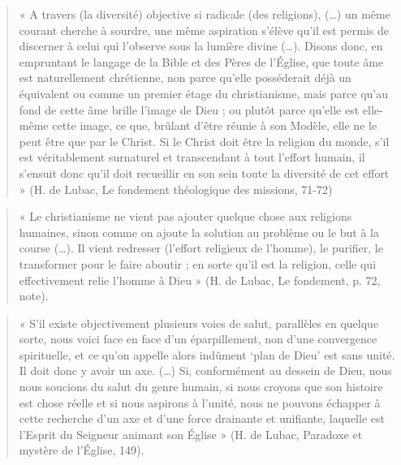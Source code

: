    \begin{quote}
        «  A  travers  (la  diversité)  objective  si  radicale  (des  religions),  (…)  un  même  courant  cherche  à  sourdre, une  même  aspiration  s’élève  qu’il  est  permis  de  discerner  à  celui  qui  l’observe  sous  la  lumière  divine (…).  Disons  donc,  en  empruntant  le  langage  de  la  Bible  et  des  Pères  de  l’Église,  que  toute  âme  est naturellement  chrétienne,  non  parce  qu’elle  posséderait  déjà  un  équivalent  ou  comme  un  premier  étage du  christianisme,  mais  parce  qu’au  fond  de  cette  âme  brille  l’image  de  Dieu  ;  ou  plutôt  parce  qu’elle est  elle-même  cette  image,  ce  que,  brûlant  d’être  réunie  à  son  Modèle,  elle  ne  le  peut  être  que  par  le Christ.  Si  le  Christ  doit  être  la  religion  du  monde,  s’il  est  véritablement  surnaturel  et  transcendant  à tout  l’effort  humain,  il  s’ensuit  donc  qu’il  doit  recueillir  en  son  sein  toute  la  diversité  de  cet  effort  » (H.  de  Lubac,  Le  fondement  théologique  des  missions, 71-72)  
          \end{quote}
        \begin{quote}
        «  Le  christianisme  ne  vient  pas  ajouter  quelque  chose  aux  religions  humaines,  sinon  comme  on  ajoute la  solution  au  problème  ou  le  but  à  la  course  (…).  Il  vient  redresser  (l’effort  religieux  de  l’homme),  le purifier,  le  transformer  pour  le  faire  aboutir  ;  en  sorte  qu’il  est  la  religion,  celle  qui  effectivement  relie l’homme  à  Dieu  »  (H.  de  Lubac,  Le  fondement, p. 72, note). 
        
        
            
        \end{quote}
        \begin{quote}«  S’il  existe  objectivement  plusieurs  voies  de  salut,  parallèles  en  quelque  sorte,  nous  voici  face  en  face d’un  éparpillement,  non  d’une  convergence  spirituelle,  et  ce  qu’on  appelle  alors  indûment  ‘plan  de Dieu’  est  sans  unité.  Il  doit  donc  y  avoir  un  axe.  (…)  Si,  conformément  au  dessein  de  Dieu,  nous  nous soucions  du  salut  du  genre  humain,  si  nous  croyons  que  son  histoire  est  chose  réelle  et  si  nous  aspirons à  l’unité,  nous  ne  pouvons  échapper  à  cette  recherche  d’un  axe  et  d’une  force  drainante  et  unifiante, laquelle  est  l’Esprit  du  Seigneur  animant  son  Église  »  (H.  de  Lubac,  Paradoxe  et  mystère  de  l’Église, 149). 
   \end{quote}
    
